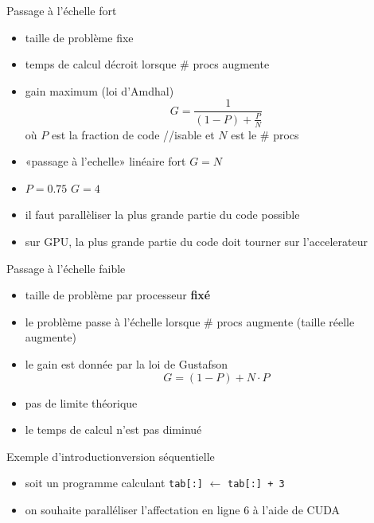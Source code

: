 \documentclass[11pt,mathserif]{beamer}
\newcommand{\scout}{\faAngellist}
\newcommand{\gezi}{\faLongArrowRight}
\newcommand{\galde}{\faQuestion}
\newcommand{\hand}{\faHandORight}
\newcommand{\argi}{\faLightbulbO}
\newcommand{\kontuz}{\faExclamationTriangle}
\newcommand{\triste}{\faFrownO}
\newcommand{\egia}{\faCheckCircle}
\newcommand{\adibi}{\faCommentO}
\newcommand{\geziBikoitz}{\faArrowsH}
\newif\ifC
\newcommand{\mylang}{c}
\newcommand{\extlang}{c}
\newcommand{\mylang}{fortran}
\newcommand{\extlang}{f90}
\newcommand{\includeSrc}[1]{}
\begin{document}
\begin{frame}{Passage à l'échelle fort}
\begin{itemize}[<+->]
  \item[\egia] taille de problème fixe
  \item[\scout] temps de calcul décroit lorsque \# procs augmente
  \item[\argi] gain maximum (loi d'Amdhal)
\begin{equation*}
G = \frac{1}{(1-P)+ \frac{P}{N}}
\end{equation*}
où $P$ est la fraction de code //isable et $N$ est le \# procs
 \item[\scout] «passage à l'echelle» linéaire fort \geziBikoitz  $G = N$
 \item[\adibi] $P = 0.75$ \gezi $G = 4$ \triste
 \item[\hand] il faut parallèliser la plus grande partie du code possible
 \item[\kontuz] sur GPU, la plus grande partie du code doit tourner sur l'accelerateur
\end{itemize}
\end{frame}

\begin{frame}{Passage à l'échelle faible}
\begin{itemize}[<+->]
  \item[\egia] taille de problème par processeur {\bf fixé}
  \item[\scout] le problème passe à l'échelle lorsque \# procs augmente (taille réelle augmente)
  \item[\argi] le gain est donnée par la loi de Gustafson
\begin{equation*}
G = (1-P) + N\cdot P
\end{equation*}
 \item[\scout] pas de limite théorique
 \item[\kontuz] le temps de calcul n'est pas diminué
\end{itemize}
\end{frame}

\begin{frame}{Exemple d'introduction}{version séquentielle}
\pause
\begin{itemize}[<+->]
  \item[\adibi] soit un programme calculant \texttt{tab[:]} $\leftarrow$ \texttt{tab[:] + 3}
  \includeSrc{code/increment}
\ifC
   \item[\galde] on souhaite paralléliser la boucle en ligne 6 à l'aide de CUDA
\else
   \item[\galde] on souhaite paralléliser l'affectation en ligne 6 à l'aide de CUDA
\fi
\end{itemize}
\end{frame}
\end{document}
